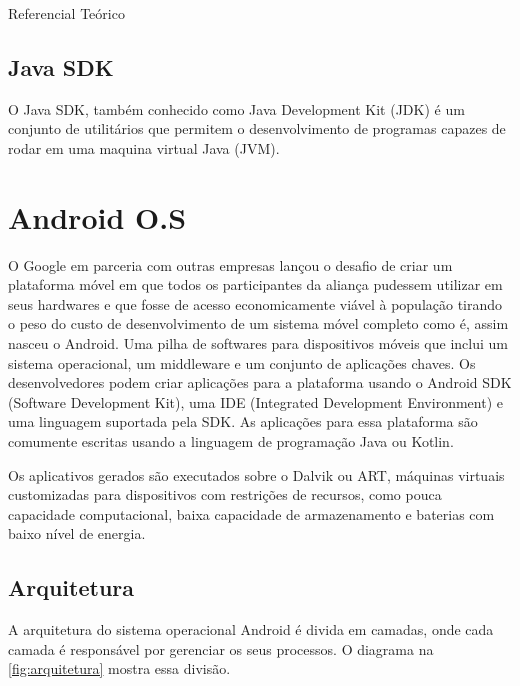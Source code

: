 \documentclass[
	12pt,				%
	openright,			%
	twoside,			%
	a4paper,			%
	english,			%
	french,				%
	spanish,			%
	brazil				%
	]{abntex2}
\begin{document}
\begin{chapter}{Referencial Teórico}
\subsection{Java SDK}
O Java SDK, também conhecido como Java Development Kit (JDK) é um conjunto de utilitários que permitem o desenvolvimento de programas capazes de rodar em uma maquina virtual Java (JVM).

\section{Android O.S}
O Google em parceria com outras empresas lançou o desafio de criar um plataforma móvel em que todos os participantes da aliança pudessem utilizar em seus hardwares e que fosse de acesso economicamente viável à população tirando o peso do custo de desenvolvimento de um sistema móvel completo como é, assim nasceu o Android. Uma pilha de softwares para dispositivos móveis que inclui um sistema operacional, um middleware e um conjunto de aplicações chaves. Os desenvolvedores podem criar aplicações para a plataforma usando o Android SDK (Software Development Kit), uma IDE (Integrated Development Environment) e uma linguagem suportada pela SDK. As aplicações para essa plataforma são comumente escritas usando a linguagem de programação Java ou Kotlin.

Os aplicativos gerados são executados sobre o Dalvik ou ART,  máquinas virtuais customizadas para dispositivos com restrições de recursos, como pouca capacidade computacional, baixa capacidade de armazenamento e baterias com baixo nível de energia.

\newpage
\subsection{Arquitetura}
A arquitetura do sistema operacional Android é divida em camadas, onde cada camada é responsável por gerenciar os seus processos. O diagrama na \autoref{fig:arquitetura} mostra essa divisão.


\end{chapter}
\end{document}
